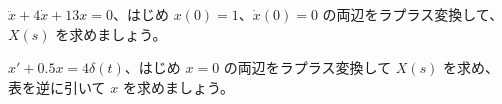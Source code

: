 \begingroup{}%
\noindent\begin{minipage}[t]{0.485\linewidth}\vspace{0pt}
\begin{jibun}
\raggedright $\ddot x+4\dot x+13x=0$、はじめ $x(0)=1$、$\dot x(0)=0$ の両辺をラプラス変換して、$X(s)$ を求めましょう。
\end{jibun}
\end{minipage}\hfill
\begin{minipage}[t]{0.485\linewidth}\vspace{0pt}
\begin{jibun}
\raggedright $x'+0.5x=4\delta(t)$、はじめ $x=0$ の両辺をラプラス変換して $X(s)$ を求め、表を逆に引いて $x$ を求めましょう。
\end{jibun}
\end{minipage}\par
\endgroup

